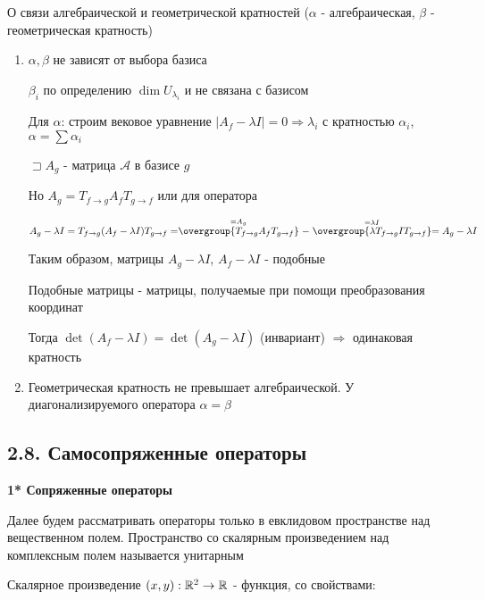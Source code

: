 \documentclass[12pt]{article}
\begin{document}
    \Nota О связи алгебраической и геометрической кратностей ($\alpha$ - алгебраическая, $\beta$ - геометрическая кратность)

    \begin{enumerate}
        \item $\alpha, \beta$ не зависят от выбора базиса

        \begin{MyProof}
            $\beta_i$ по определению $\dim U_{\lambda_i}$ и не связана с базисом

            Для $\alpha$: строим вековое уравнение $|A_f - \lambda I| = 0 \Longrightarrow \lambda_i$ с кратностью $\alpha_i$, $\alpha = \sum \alpha_i$

            $\sqsupset A_g$ - матрица $\mathcal{A}$ в базисе $g$

            Но $A_g = T_{f\to g} A_f T_{g\to f}$ или для оператора

            $A_g - \lambda I = T_{f\to g} (A_f - \lambda I) T_{g\to f} =
            \stackrel{= A_g}{\overgroup{T_{f\to g} A_f T_{g\to f}}} - \stackrel{= \lambda I}{\overgroup{\lambda T_{f\to g} I T_{g\to f}}} =
            A_g - \lambda I$

            Таким образом, матрицы $A_g - \lambda I$, $A_f - \lambda I$ - подобные

            \Def Подобные матрицы - матрицы, получаемые при помощи преобразования координат

            Тогда $\det (A_f - \lambda I) = \det (A_g - \lambda I)$ (инвариант) $\Longrightarrow$ одинаковая кратность

        \end{MyProof}

        \item Геометрическая кратность не превышает алгебраической. У диагонализируемого оператора $\alpha = \beta$
    \end{enumerate}

    \subsection{2.8. Самосопряженные операторы}

    \textbf{1* Сопряженные операторы}

    Далее будем рассматривать операторы только в евклидовом пространстве над вещественном полем.
    Пространство со скалярным произведением над комплексным полем называется унитарным

    \Mem Скалярное произведение $(x, y) : \mathbb{R}^2 \rightarrow \mathbb{R}$ - функция, со свойствами:
\end{document}
